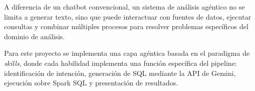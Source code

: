 A diferencia de un chatbot convencional, un sistema de análisis agéntico no se limita a
generar texto, sino que puede interactuar con fuentes de datos, ejecutar consultas y
combinar múltiples procesos para resolver problemas específicos del dominio de análisis.

Para este proyecto se implementa una capa agéntica basada en el paradigma de \textit{skills},
donde cada habilidad implementa una función específica del pipeline:
identificación de intención, generación de SQL mediante la API de Gemini,
ejecución sobre Spark SQL y presentación de resultados.
